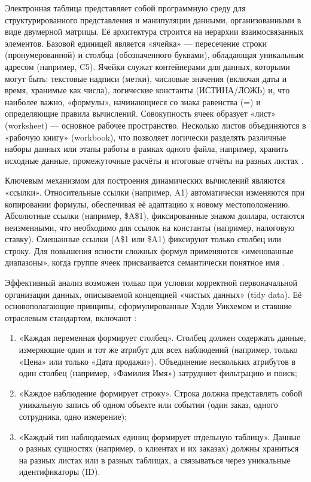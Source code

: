 \documentclass{SibFU-docs}
\begin{document}

Электронная таблица представляет собой программную среду для структурированного представления и манипуляции данными, организованными в виде двумерной матрицы. Её архитектура строится на иерархии взаимосвязанных элементов. Базовой единицей является «ячейка» --- пересечение строки (пронумерованной) и столбца (обозначенного буквами), обладающая уникальным адресом (например, C5). Ячейки служат контейнерами для данных, которыми могут быть: текстовые надписи (метки), числовые значения (включая даты и время, хранимые как числа), логические константы (ИСТИНА/ЛОЖЬ) и, что наиболее важно, «формулы», начинающиеся со знака равенства (=) и определяющие правила вычислений. Совокупность ячеек образует «лист» (worksheet) --- основное рабочее пространство. Несколько листов объединяются в «рабочую книгу» (workbook), что позволяет логически разделять различные наборы данных или этапы работы в рамках одного файла, например, хранить исходные данные, промежуточные расчёты и итоговые отчёты на разных листах \cite{walkenbach_excel_bible_2019, gormley_data_organization_2018}.

Ключевым механизмом для построения динамических вычислений являются «ссылки». Относительные ссылки (например, A1) автоматически изменяются при копировании формулы, обеспечивая её адаптацию к новому местоположению. Абсолютные ссылки (например, \$A\$1), фиксированные знаком доллара, остаются неизменными, что необходимо для ссылок на константы (например, налоговую ставку). Смешанные ссылки (A\$1 или \$A1) фиксируют только столбец или строку. Для повышения ясности сложных формул применяются «именованные диапазоны», когда группе ячеек присваивается семантически понятное имя \cite{saffr2019}.


Эффективный анализ возможен только при условии корректной первоначальной организации данных, описываемой концепцией «чистых данных» (tidy data). Её основополагающие принципы, сформулированные Хэдли Уикхемом и ставшие отраслевым стандартом, включают \cite{turingway_spreadsheets, uofiowa_spreadsheet_structure}:

\begin{enumerate}
\item «Каждая переменная формирует столбец». Столбец должен содержать данные, измеряющие один и тот же атрибут для всех наблюдений (например, только «Цена» или только «Дата продажи»). Объединение нескольких атрибутов в один столбец (например, «Фамилия Имя») затрудняет фильтрацию и поиск;
\item «Каждое наблюдение формирует строку». Строка должна представлять собой уникальную запись об одном объекте или событии (один заказ, одного сотрудника, одно измерение);
\item «Каждый тип наблюдаемых единиц формирует отдельную таблицу». Данные о разных сущностях (например, о клиентах и их заказах) должны храниться на разных листах или в разных таблицах, а связываться через уникальные идентификаторы (ID).
\end{enumerate}
\end{document}
